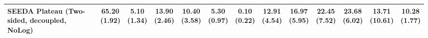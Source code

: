 \begin{table}[H]
{\begin{tabular}{l|cccccc|cccccc}
SEEDA Plateau (Two-sided, decoupled, NoLog) & \bfseries \makecell{65.20 \\ (1.92)} & \makecell{5.10 \\ (1.34)} & {\cellcolor[HTML]{C8E6C9}} \makecell{13.90 \\ (2.46)} & \makecell{10.40 \\ (3.58)} & \makecell{5.30 \\ (0.97)} & \makecell{0.10 \\ (0.22)} & \makecell{12.91 \\ (4.54)} & \makecell{16.97 \\ (5.95)} & {\cellcolor[HTML]{C8E6C9}} \makecell{22.45 \\ (7.52)} & \bfseries \makecell{23.68 \\ (6.02)} & \makecell{13.71 \\ (10.61)} & \makecell{10.28 \\ (1.77)} \\
\bottomrule
\end{tabular}
}%
\end{table}
